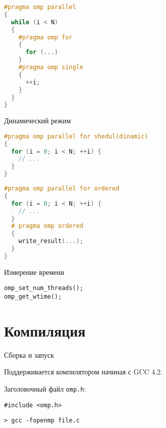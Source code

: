 \begin{frame}[fragile]

\begin{lstlisting}[language=C++,basicstyle=\ttfamily,keywordstyle=\color{blue},basicstyle=\scriptsize]
#pragma omp parallel
{
  while (i < N)
  {
    #pragma omp for
    {
      for (...)
    }
    #pragma omp single
    {
      ++i;
    }
  }
}
\end{lstlisting}

\end{frame}

\begin{frame}[fragile]{Динамический режим}

\begin{lstlisting}[language=C++,basicstyle=\ttfamily,keywordstyle=\color{blue},basicstyle=\scriptsize]
#pragma omp parallel for shedul(dinamic)
{
  for (i = 0; i < N; ++i) {
    // ...
  }
}
\end{lstlisting}

\end{frame}

\begin{frame}[fragile]

\begin{lstlisting}[language=C++,basicstyle=\ttfamily,keywordstyle=\color{blue},basicstyle=\scriptsize]
#pragma omp parallel for ordered
{
  for (i = 0; i < N; ++i) {
    // ...
  }
  # pragma omp ordered
  {
    write_result(...);
  }
}
\end{lstlisting}

\end{frame}

\begin{frame}[fragile]{Измерение времени}

\begin{lstlisting}
omp_set_num_threads();
omp_get_wtime();
\end{lstlisting}

\end{frame}

\section{Компиляция}

\begin{frame}[fragile]{Сборка и запуск}

Поддерживается компилятором начиная с GCC 4.2.

Заголовочный файл \texttt{omp.h}:

\begin{lstlisting}
#include <omp.h>
\end{lstlisting}

\begin{lstlisting}
> gcc -fopenmp file.c
\end{lstlisting}

\end{frame}

